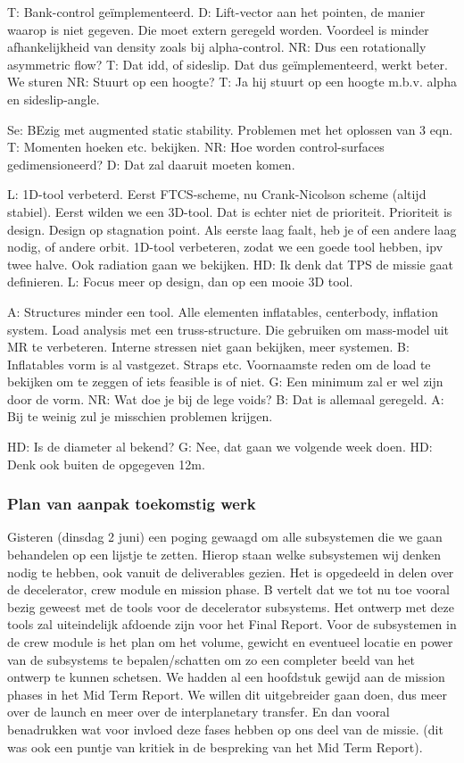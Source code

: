 T: Bank-control geïmplementeerd. 
D: Lift-vector aan het pointen, de manier waarop is niet gegeven. Die moet extern geregeld worden. Voordeel is minder afhankelijkheid van density zoals bij alpha-control. 
NR: Dus een rotationally asymmetric flow?
T: Dat idd, of sideslip. Dat dus geïmplementeerd, werkt beter. We sturen 
NR: Stuurt op een hoogte?
T: Ja hij stuurt op een hoogte m.b.v. alpha en sideslip-angle. 

Se: BEzig met augmented static stability. Problemen met het oplossen van 3 eqn.
T: Momenten hoeken etc. bekijken.
NR: Hoe worden control-surfaces gedimensioneerd?
D: Dat zal daaruit moeten komen.

L: 1D-tool verbeterd. Eerst FTCS-scheme, nu Crank-Nicolson scheme (altijd stabiel). Eerst wilden we een 3D-tool. Dat is echter niet de prioriteit. Prioriteit is design. Design op stagnation point. Als eerste laag faalt, heb je of een andere laag nodig, of andere orbit. 1D-tool verbeteren, zodat we een goede tool hebben, ipv twee halve. Ook radiation gaan we bekijken.
HD: Ik denk dat TPS de missie gaat definieren.
L: Focus meer op design, dan op een mooie 3D tool.

A: Structures minder een tool. Alle elementen inflatables, centerbody, inflation system. Load analysis met een truss-structure. Die gebruiken om mass-model uit MR te verbeteren. Interne stressen niet gaan bekijken, meer systemen.
B: Inflatables vorm is al vastgezet. Straps etc. Voornaamste reden om de load te bekijken om te zeggen of iets feasible is of niet. 
G: Een minimum zal er wel zijn door de vorm.
NR: Wat doe je bij de lege voids?
B: Dat is allemaal geregeld.
A: Bij te weinig zul je misschien problemen krijgen.

HD: Is de diameter al bekend?
G: Nee, dat gaan we volgende week doen.
HD: Denk ook buiten de opgegeven 12m.

\subsubsection{Plan van aanpak toekomstig werk}
Gisteren (dinsdag 2 juni) een poging gewaagd om alle subsystemen die we gaan behandelen op een lijstje te zetten. Hierop staan welke subsystemen wij denken nodig te hebben, ook vanuit de deliverables gezien. Het is opgedeeld in delen over de decelerator, crew module en mission phase.
\newline
B vertelt dat we tot nu toe vooral bezig geweest met de tools voor de decelerator subsystems. Het ontwerp met deze tools zal uiteindelijk afdoende zijn voor het Final Report. Voor de subsystemen in de crew module is het plan om het volume, gewicht en eventueel locatie en power van de subsystems te bepalen/schatten om zo een completer beeld van het ontwerp te kunnen schetsen. We hadden al een hoofdstuk gewijd aan de mission phases in het Mid Term Report. We willen dit uitgebreider gaan doen, dus meer over de launch en meer over de interplanetary transfer. En dan vooral benadrukken wat voor invloed deze fases hebben op ons deel van de missie. (dit was ook een puntje van kritiek in de bespreking van het Mid Term Report).

